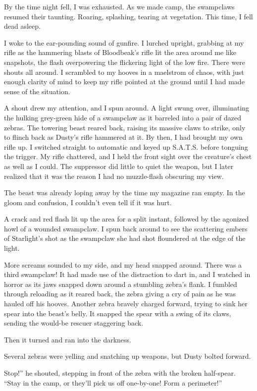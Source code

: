 By the time night fell, I was exhausted. As we made camp, the swampclaws resumed their taunting. Roaring, splashing, tearing at vegetation. This time, I fell dead asleep.

I woke to the ear-pounding sound of gunfire. I lurched upright, grabbing at my rifle as the hammering blasts of Bloodbeak’s rifle lit the area around me like snapshots, the flash overpowering the flickering light of the low fire. There were shouts all around. I scrambled to my hooves in a maelstrom of chaos, with just enough clarity of mind to keep my rifle pointed at the ground until I had made sense of the situation.

A shout drew my attention, and I spun around. A light swung over, illuminating the hulking grey-green hide of a swampclaw as it barreled into a pair of dazed zebras. The towering beast reared back, raising its massive claws to strike, only to flinch back as Dusty’s rifle hammered at it. By then, I had brought my own rifle up. I switched straight to automatic and keyed up S.A.T.S. before tonguing the trigger. My rifle chattered, and I held the front sight over the creature’s chest as well as I could. The suppressor did little to quiet the weapon, but I later realized that it was the reason I had no muzzle-flash obscuring my view.

The beast was already loping away by the time my magazine ran empty. In the gloom and confusion, I couldn’t even tell if it was hurt.

A crack and red flash lit up the area for a split instant, followed by the agonized howl of a wounded swampclaw. I spun back around to see the scattering embers of Starlight’s shot as the swampclaw she had shot floundered at the edge of the light.

More screams sounded to my side, and my head snapped around. There was a third swampclaw! It had made use of the distraction to dart in, and I watched in horror as its jaws snapped down around a stumbling zebra’s flank. I fumbled through reloading as it reared back, the zebra giving a cry of pain as he was hauled off his hooves. Another zebra bravely charged forward, trying to sink her spear into the beast’s belly. It snapped the spear with a swing of its claws, sending the would-be rescuer staggering back.

Then it turned and ran into the darkness.

Several zebras were yelling and snatching up weapons, but Dusty bolted forward.

\leavevmode{}Stop!” he shouted, stepping in front of the zebra with the broken half-spear. “Stay in the camp, or they’ll pick us off one-by-one! Form a perimeter!”

